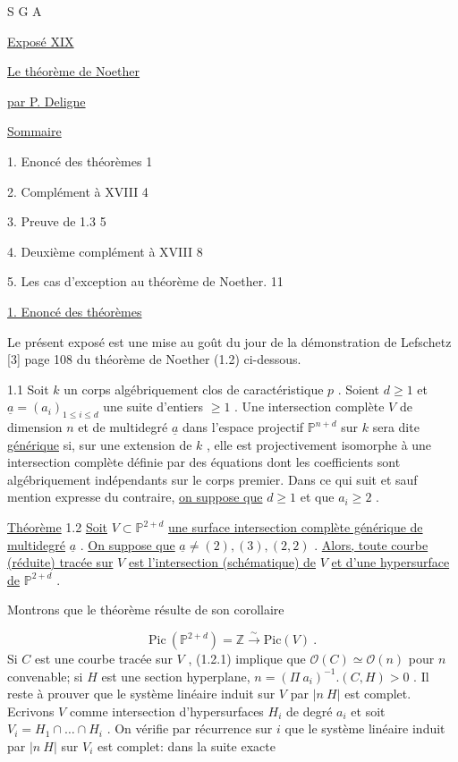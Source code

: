 


S G A 


\underline{Exposé XIX}


\underline{\underline{Le théorème de Noether}}


\underline{par \quad P. Deligne}


\underline{Sommaire}

1. Enoncé des théorèmes \hfill 1

2. Complément à XVIII \hfill 4

3. Preuve de 1.3 \hfill 5

4. Deuxième complément à XVIII \hfill 8

5. Les cas d'exception au théorème de Noether. \hfill 11


\underline{1. Enoncé des théorèmes}

Le présent exposé est une mise au goût du jour de la démonstration de Lefschetz [3] page 108 du théorème de Noether (1.2) ci-dessous.

1.1 \qquad Soit $k$ un corps algébriquement clos de caractéristique $p$ . Soient $d \geq 1$ et $\underline{a} = (a_i)_{1 \leq i \leq d}$ une suite d'entiers $\geq 1$ . Une intersection complète $V$ de dimension $n$ et de multidegré $\underline{a}$ dans l'espace projectif $\mathbb{P}^{n+d}$ sur $k$ sera dite \underline{générique} si, sur une extension de $k$ , elle est projectivement isomorphe à une intersection complète définie par des équations dont les coefficients sont algébriquement indépendants sur le corps premier. Dans ce qui suit et sauf mention expresse du contraire, \underline{on suppose que} $d \geq 1$ et que $a_i \geq 2$ .

\underline{Théorème} 1.2 \qquad \underline{Soit} $V \subset \mathbb{P}^{2+d}$ \underline{une surface intersection complète générique de multidegré} $\underline{a}$ . \underline{On suppose que} $\underline{a} \neq (2), (3), (2, 2)$ . \underline{Alors, toute courbe (réduite) tracée sur} $V$ \underline{est l'intersection (schématique) de} $V$ \underline{et d'une hypersurface de} $\mathbb{P}^{2+d}$ .

Montrons que le théorème résulte de son corollaire 



\begin{equation}\tag{1.2.1}
 \mathrm{Pic}\ (\mathbb{P}^{2+d}) = \mathbb{Z} \overset{\sim}{\longrightarrow} \mathrm{Pic}(V)\ .
\end{equation}
Si $C$ est une courbe tracée sur $V$ , (1.2.1) implique que $\mathcal{O}(C) \simeq \mathcal{O}(n)$ pour $n$ convenable; si $H$ est une section hyperplane, $n = (\Pi\ a_i)^{-1}.(C, H) > 0$ . Il reste à prouver que le système linéaire induit sur $V$ par $|n\ H|$ est complet. Ecrivons $V$ comme intersection d'hypersurfaces $H_i$ de degré $a_i$ et soit $V_i = H_1 \cap \ldots \cap H_i$ . On vérifie par récurrence sur $i$ que le système linéaire induit par $|n\ H|$ sur $V_i$ est complet: dans la suite exacte

